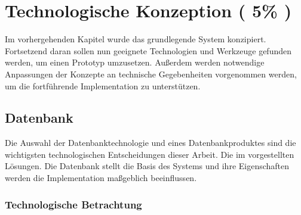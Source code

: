 \chapter{Technologische Konzeption ( 5\% )}


Im vorhergehenden Kapitel wurde das grundlegende System konzipiert.
Fortsetzend daran sollen nun geeignete Technologien und Werkzeuge gefunden werden,
um einen Prototyp umzusetzen.
Außerdem werden notwendige Anpassungen der Konzepte an technische Gegebenheiten vorgenommen werden,
um die fortf\"uhrende Implementation zu unterst\"utzen.





\section{Datenbank}

Die Auswahl der Datenbanktechnologie und eines Datenbankproduktes sind die wichtigsten technologischen Entscheidungen dieser Arbeit.
Die im  vorgestellten L\"osungen.
Die Datenbank stellt die Basis des Systems und ihre Eigenschaften werden die Implementation maßgeblich beeinflussen.


\subsection{Technologische Betrachtung}

